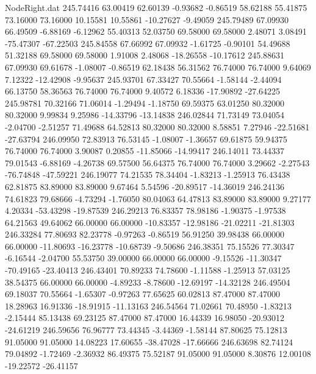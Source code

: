 \begin{filecontents}{NodeRight.dat}
 245.74416   63.00419   62.60139    -0.93682   -0.86519   58.62188   55.41875   73.16000   73.16000   10.15581   10.55861  -10.27627   -9.49059
 245.79489   67.09930   66.49509    -6.88169   -6.12962   55.40313   52.03750   69.58000   69.58000    2.48071    3.08491  -75.47307  -67.22503
 245.84558   67.66992   67.09932    -1.61725   -0.90101   54.49688   51.32188   69.58000   69.58000    1.91008    2.48068  -18.26558  -10.17612
 245.88631   67.09930   69.61678    -1.08007   -0.86519   62.18438   56.31562   76.74000   76.74000    9.64069    7.12322  -12.42908   -9.95637
 245.93701   67.33427   70.55664    -1.58144   -2.44094   66.13750   58.36563   76.74000   76.74000    9.40572    6.18336  -17.90892  -27.64225
 245.98781   70.32166   71.06014    -1.29494   -1.18750   69.59375   63.01250   80.32000   80.32000    9.99834    9.25986  -14.33796  -13.14838
 246.02844   71.73149   73.04054    -2.04700   -2.51257   71.49688   64.52813   80.32000   80.32000    8.58851    7.27946  -22.51681  -27.63794
 246.09950   72.83913   76.53145    -1.08007   -1.36657   69.61875   59.94375   76.74000   76.74000    3.90087    0.20855  -11.85066  -14.99417
 246.14011   73.44337   79.01543    -6.88169   -4.26738   69.57500   56.64375   76.74000   76.74000    3.29662   -2.27543  -76.74848  -47.59221
 246.19077   74.21535   78.34404    -1.83213   -1.25913   76.43438   62.81875   83.89000   83.89000    9.67464    5.54596  -20.89517  -14.36019
 246.24136   74.61823   79.68666    -4.73294   -1.76050   80.04063   64.47813   83.89000   83.89000    9.27177    4.20334  -53.43298  -19.87539
 246.29213   76.83357   78.98186    -1.90375   -1.97538   64.21563   49.64062   66.00000   66.00000  -10.83357  -12.98186  -21.02211  -21.81303
 246.33284   77.80693   82.23778    -0.97263   -0.86519   56.91250   39.98438   66.00000   66.00000  -11.80693  -16.23778  -10.68739   -9.50686
 246.38351   75.15526   77.30347    -6.16544   -2.04700   55.53750   39.00000   66.00000   66.00000   -9.15526  -11.30347  -70.49165  -23.40413
 246.43401   70.89233   74.78600    -1.11588   -1.25913   57.03125   38.54375   66.00000   66.00000   -4.89233   -8.78600  -12.69197  -14.32128
 246.49504   69.18037   70.55664    -1.65307   -0.97263   77.65625   60.02813   87.47000   87.47000   18.28963   16.91336  -18.91915  -11.13163
 246.54564   71.02661   70.48950    -1.83213   -2.15444   85.13438   69.23125   87.47000   87.47000   16.44339   16.98050  -20.93012  -24.61219
 246.59656   76.96777   73.44345    -3.44369   -1.58144   87.80625   75.12813   91.05000   91.05000   14.08223   17.60655  -38.47028  -17.66666
 246.63698   82.74124   79.04892    -1.72469   -2.36932   86.49375   75.52187   91.05000   91.05000    8.30876   12.00108  -19.22572  -26.41157

\end{filecontents}
